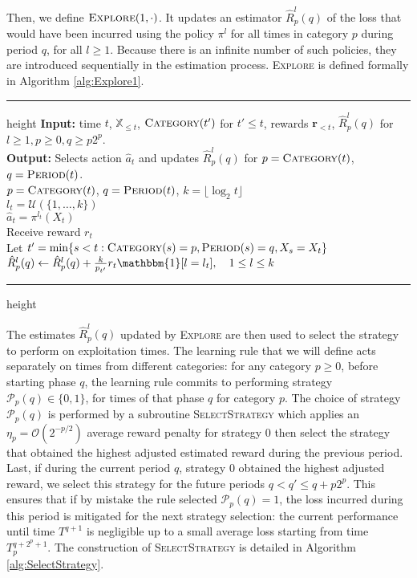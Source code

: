 \documentclass[aos]{imsart}
\theoremstyle{plain}
\theoremstyle{remark}
\newcommand{\Pcal}{\mathcal{P}}
\newcommand{\Ucal}{\mathcal{U}}
\newcommand{\Ocal}{\mathcal{O}}
\newcommand{\Xbb}{\mathbb{X}}
\newcommand{\1}{\mathbbm{1}}%
\newcommand{\mb}[1]{\ensuremath{\boldsymbol{#1}}}
\begin{document}
Then, we define $\textsc{Explore}(1,\cdot)$. It updates an estimator $\hat R^l_p(q)$ of the loss that would have been incurred using the policy $\pi^l$ for all times in category $p$ during period $q$, for all $l\geq 1$. Because there is an infinite number of such policies, they are introduced sequentially in the estimation process. \textsc{Explore} is defined formally in Algorithm \ref{alg:Explore1}.

\begin{algorithm}
\caption{$\textsc{Explore}(1;\cdot)$}\label{alg:Explore1}
\hrule height\algoheightrule\kern3pt\relax
\textbf{Input:} time $t$, $\Xbb_{\leq t}$, $\textsc{Category}(t')$ for $t'\leq t$, rewards $\mb r_{<t}$, $\hat R_p^l(q)$ for $l\geq 1,p\geq 0,q\geq p2^p$.\\
\textbf{Output:} Selects action $\hat a_t$ and updates $\hat R_p^l(q)$ for $p= \textsc{Category}(t)$, $q=\textsc{Period}(t)$.\\

$p=\textsc{Category}(t)$, $q=\textsc{Period}(t)$, $k = \lfloor \log_2 t \rfloor$\\
$l_t = \Ucal(\{1,\ldots,k\})$  \\
$\hat a_t = \pi^{l_t}(X_t)$\\
Receive reward $r_t$\\
Let $t'=\min \{s<t:\textsc{Category}(s) = p, \textsc{Period}(s)=q, X_s=X_t\}$ \\
$\hat R_p^l(q) \gets \hat R_p^l(q) + \frac{k}{p_{t'}}r_t\1[l=l_t],\quad 1\leq l\leq k$ 

\hrule height\algoheightrule\kern3pt\relax
\end{algorithm}

The estimates $\hat R^l_p(q)$ updated by \textsc{Explore} are then used to select the strategy to perform on exploitation times. The learning rule that we will define acts separately on times from different categories: for any category $p\geq 0$, before starting phase $q$, the learning rule commits to performing strategy $\Pcal_p(q)\in\{0,1\}$, for times of that phase $q$ for category $p$. The choice of strategy $\Pcal_p(q)$ is performed by a subroutine \textsc{SelectStrategy} which applies an $\eta_p=\Ocal(2^{-p/2})$ average reward penalty for strategy $0$ then select the strategy that obtained the highest adjusted estimated reward during the previous period. Last, if during the current period $q$, strategy $0$ obtained the highest adjusted reward, we select this strategy for the future periods $q<q'\leq q+p2^p$. This ensures that if by mistake the rule selected $\Pcal_p(q)=1$, the loss incurred during this period is mitigated for the next strategy selection: the current performance until time $T^{q+1}$ is negligible up to a small average loss starting from time $T_p^{q+2^p+1}$. The construction of \textsc{SelectStrategy} is detailed in Algorithm \ref{alg:SelectStrategy}.
\end{document}
